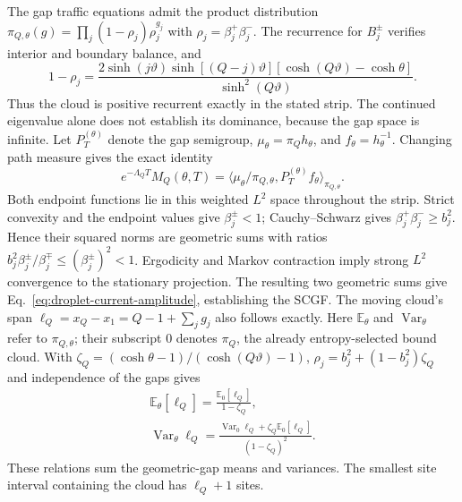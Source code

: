 \documentclass[aps,pre,reprint,amsmath,amssymb,longbibliography,floatfix]{revtex4-2}
\newcommand{\E}{\mathbb E}
\begin{document}
The gap traffic equations admit the product distribution
$\pi_{Q,\theta}(g)=\prod_j(1-\rho_j)\rho_j^{g_j}$ with
$\rho_j=\beta_j^+\beta_j^-$. The recurrence for $B_j^\pm$ verifies
interior and boundary balance, and
\begin{equation}
 1-\rho_j=\frac{2\sinh(j\vartheta)\sinh\left[(Q-j)\vartheta\right]
 \left[\cosh(Q\vartheta)-\cosh\theta\right]}{\sinh^2(Q\vartheta)}.
 \label{eq:droplet-current-stability}
\end{equation}
Thus the cloud is positive recurrent exactly in the stated strip.
The continued eigenvalue alone does not establish its dominance, because
the gap space is infinite. Let $P_T^{(\theta)}$ denote the gap semigroup,
$\mu_\theta=\pi_Qh_\theta$, and $f_\theta=h_\theta^{-1}$. Changing path
measure gives the exact identity
\begin{equation}
 e^{-\Lambda_QT}M_Q(\theta,T)
 =\langle\mu_\theta/\pi_{Q,\theta},
                 P_T^{(\theta)}f_\theta\rangle_{\pi_{Q,\theta}}.
 \label{eq:droplet-current-endpoints}
\end{equation}
Both endpoint functions lie in this weighted $L^2$ space throughout the
strip. Strict convexity and the endpoint values give $\beta_j^\pm<1$;
Cauchy--Schwarz gives $\beta_j^+\beta_j^-\ge b_j^2$. Hence their squared
norms are geometric sums with ratios
$b_j^2\beta_j^\pm/\beta_j^\mp\le(\beta_j^\pm)^2<1$.
Ergodicity and Markov contraction imply strong $L^2$ convergence to the
stationary projection. The resulting two geometric sums give
Eq.~\eqref{eq:droplet-current-amplitude}, establishing the SCGF.
The moving cloud's span $\ell_Q=x_Q-x_1=Q-1+\sum_jg_j$ also follows
exactly. Here $\E_\theta$ and $\operatorname{Var}_\theta$ refer to
$\pi_{Q,\theta}$; their subscript $0$ denotes $\pi_Q$, the already
entropy-selected bound cloud. With $\zeta_Q=(\cosh\theta-1)/(\cosh(Q\vartheta)-1)$,
$\rho_j=b_j^2+(1-b_j^2)\zeta_Q$ and independence of the gaps gives
\begin{equation}
 \begin{gathered}
 \E_\theta\left[\ell_Q\right]=\frac{\E_0\left[\ell_Q\right]}{1-\zeta_Q},\\
 \operatorname{Var}_\theta\ell_Q=
 \frac{\operatorname{Var}_0\ell_Q+\zeta_Q\E_0\left[\ell_Q\right]}
 {(1-\zeta_Q)^2}.
 \end{gathered}\label{eq:droplet-current-swelling}
\end{equation}
These relations sum the geometric-gap means and variances. The smallest
site interval containing the cloud has $\ell_Q+1$ sites.
\end{document}
